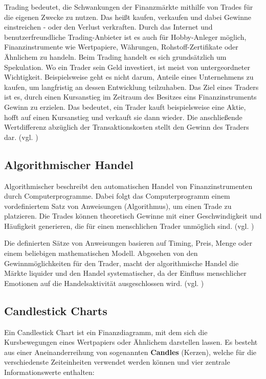 \documentclass[oneside]{ausarbeitung}
\begin{document}
Trading bedeutet, die Schwankungen der Finanzmärkte mithilfe von
Trades für die eigenen Zwecke zu nutzen. Das heißt kaufen, verkaufen
und dabei Gewinne einstreichen - oder den Verlust verkraften. Durch
das Internet und benutzerfreundliche Trading-Anbieter ist es auch für
Hobby-Anleger möglich, Finanzinstrumente wie Wertpapiere, Währungen,
Rohstoff-Zertifikate oder Ähnlichem zu handeln. Beim Trading handelt
es sich grundsätzlich um Spekulation. Wo ein Trader sein Geld
investiert, ist meist von untergeordneter Wichtigkeit. Beispielsweise
geht es nicht darum, Anteile eines Unternehmens zu kaufen, um
langfristig an dessen Entwicklung teilzuhaben. Das Ziel eines Traders
ist es, durch einen Kursanstieg im Zeitraum des Besitzes eins
Finanzinstruments Gewinn zu erzielen. Das bedeutet, ein Trader kauft
beispielsweise eine Aktie, hofft auf einen Kursanstieg und verkauft
sie dann wieder. Die anschließende Wertdifferenz abzüglich der
Transaktionskosten stellt den Gewinn des Traders dar. (vgl.
\cite{trading_2})

\subsection{Algorithmischer Handel}
\label{sub:algorithmischer_handel}

Algorithmischer beschreibt den automatischen Handel von
Finanzinstrumenten durch Computerprogramme. Dabei folgt das
Computerprogramm einem vordefiniertem Satz von Anweisungen
(Algorithmus), um einen Trade zu platzieren. Die Trades können
theoretisch Gewinne mit einer Geschwindigkeit und Häufigkeit
generieren, die für einen menschlichen Trader unmöglich sind. (vgl.
\cite{algorithmic_trading})

Die definierten Sätze von Anweisungen basieren auf Timing, Preis,
Menge oder einem beliebigen mathematischen Modell. Abgesehen von den
Gewinnmöglichkeiten für den Trader, macht der algorithmische Handel
die Märkte liquider und den Handel systematischer, da der Einfluss
menschlicher Emotionen auf die Handelsaktivität ausgeschlossen wird.
(vgl. \cite{algorithmic_trading})

\subsection{Candlestick Charts}
\label{sub:candlestick_charts}

Ein Candlestick Chart ist ein Finanzdiagramm, mit dem sich die
Kursbewegungen eines Wertpapiers oder Ähnlichem darstellen lassen. Es
besteht aus einer Aneinanderreihung von sogenannten \textbf{Candles}
(Kerzen), welche für die verschiedenste Zeiteinheiten verwendet
werden können und vier zentrale Informationswerte enthalten:
\end{document}
